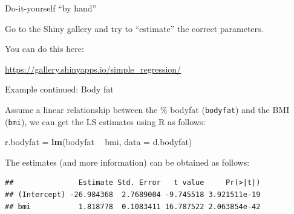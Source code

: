 \documentclass[10pt,ignorenonframetext,]{beamer}
\newenvironment{Shaded}{\begin{snugshade}}{\end{snugshade}}
\newcommand{\KeywordTok}[1]{\textcolor[rgb]{0.13,0.29,0.53}{\textbf{#1}}}
\newcommand{\DataTypeTok}[1]{\textcolor[rgb]{0.13,0.29,0.53}{#1}}
\newcommand{\StringTok}[1]{\textcolor[rgb]{0.31,0.60,0.02}{#1}}
\newcommand{\OperatorTok}[1]{\textcolor[rgb]{0.81,0.36,0.00}{\textbf{#1}}}
\newcommand{\NormalTok}[1]{#1}
\begin{document}
\begin{frame}

\begin{block}{Do-it-yourself ``by hand''}

\vspace{6mm}

Go to the Shiny gallery and try to ``estimate'' the correct parameters.
\vspace{2mm}

You can do this here: \vspace{2mm}

\url{https://gallery.shinyapps.io/simple_regression/}

\end{block}

\end{frame}

\begin{frame}[fragile]

\begin{block}{Example continued: Body fat}

\vspace{2mm}

Assume a linear relationship between the \% bodyfat (\texttt{bodyfat})
and the BMI (\texttt{bmi}), we can get the LS estimates using R as
follows:

\begin{Shaded}
\begin{Highlighting}[]
\NormalTok{r.bodyfat =}\StringTok{ }\KeywordTok{lm}\NormalTok{(bodyfat }\OperatorTok{~}\StringTok{ }\NormalTok{bmi, }\DataTypeTok{data =}\NormalTok{ d.bodyfat)}
\end{Highlighting}
\end{Shaded}

The estimates (and more information) can be obtained as follows:

\begin{Shaded}
\end{Shaded}

\begin{verbatim}
##               Estimate Std. Error   t value     Pr(>|t|)
## (Intercept) -26.984368  2.7689004 -9.745518 3.921511e-19
## bmi           1.818778  0.1083411 16.787522 2.063854e-42
\end{verbatim}

\end{block}

\end{frame}
\end{document}
